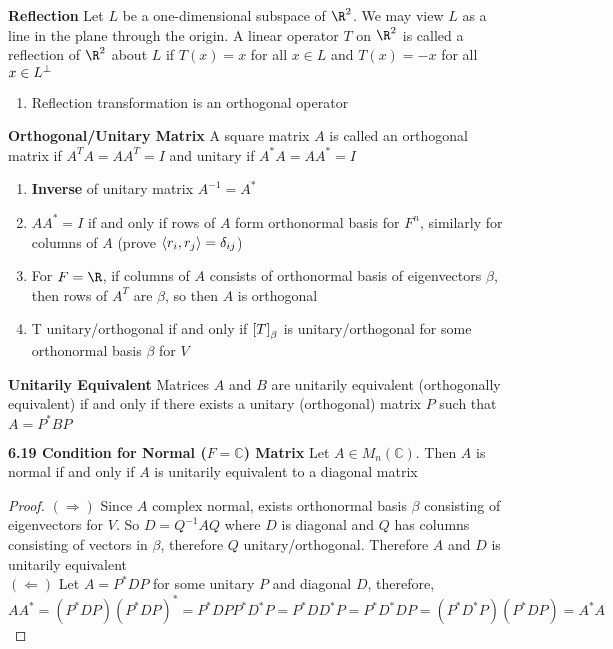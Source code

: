 \documentclass[11pt]{article}
\begin{document}
\begin{defn*}
    \textbf{Reflection} Let $L$ be a one-dimensional subspace of $\R^2$. We may view $L$ as a line in the plane through the origin. A linear operator $T$ on $\R^2$ is called a reflection of $\R^2$ about $L$ if $T(x) = x$ for all $x\in L$ and $T(x) = -x$ for all $x\in L^{\perp}$
    \begin{enumerate}
        \item Reflection transformation is an orthogonal operator
    \end{enumerate}
\end{defn*}

\begin{defn*}
    \textbf{Orthogonal/Unitary Matrix} A square matrix $A$ is called an orthogonal matrix if $A^T A = AA^T = I$ and unitary if $A^* A = AA^* = I$
    \begin{enumerate}
        \item \textbf{Inverse} of unitary matrix $A^{-1} = A^*$
        \item $AA^* = I$ if and only if rows of $A$ form orthonormal basis for $F^n$, similarly for columns of $A$ (prove $\langle r_i,r_j\rangle = \delta_{ij}$)
        \item For $F=\R$, if columns of $A$ consists of orthonormal basis of eigenvectors $\beta$, then rows of $A^T$ are $\beta$, so then $A$ is orthogonal
        \item T unitary/orthogonal if and only if $\left[ T \right]_{\beta}$ is unitary/orthogonal for some orthonormal basis $\beta$ for $V$
    \end{enumerate}
\end{defn*}

\begin{defn*}
    \textbf{Unitarily Equivalent} Matrices $A$ and $B$ are unitarily equivalent (orthogonally equivalent) if and only if there exists a unitary (orthogonal) matrix $P$ such that $A= P^* B P$
\end{defn*}

\begin{theorem*}
    \textbf{6.19 Condition for Normal ($F=\mathbb{C}$) Matrix} Let $A\in M_{n}(\mathbb{C})$. Then $A$ is normal if and only if $A$ is unitarily equivalent to a diagonal matrix
    \begin{proof}
        $(\Rightarrow)$ Since $A$ complex normal, exists orthonormal basis $\beta$ consisting of eigenvectors for $V$. So $D = Q^{-1}AQ$ where $D$ is diagonal and $Q$ has columns consisting of vectors in $\beta$, therefore $Q$ unitary/orthogonal. Therefore $A$ and $D$ is unitarily equivalent \\
        $(\Leftarrow)$ Let $A = P^*DP$ for some unitary $P$ and diagonal $D$, therefore, 
        \[
            AA^* = (P^*DP)(P^*DP)^* = P^*DPP^*D^*P = P^*DD^*P = P^*D^*DP = (P^*D^*P)(P^*DP) = A^*A
        \]
    \end{proof}
\end{theorem*}
\end{document}
